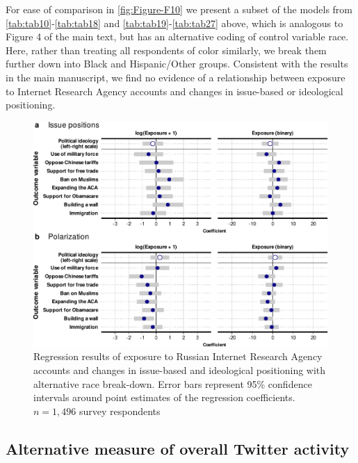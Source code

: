 \documentclass[
  12pt,
]{article}
\begin{document}
For ease of comparison in \autoref{fig:Figure-F10} we present a subset of the models from \ref{tab:tab10}-\ref{tab:tab18} and \ref{tab:tab19}-\ref{tab:tab27} above, which is analogous to Figure 4 of the main text, but has an alternative coding of control variable race. Here, rather than treating all respondents of color similarly, we break them further down into Black and Hispanic/Other groups. Consistent with the results in the main manuscript, we find no evidence of a relationship between exposure to Internet Research Agency accounts and changes in issue-based or ideological positioning.

\begin{figure}
\centering
\includegraphics{Appendix_files/figure-latex/Figure-F10-1.pdf}
\caption{\label{fig:Figure-F10}Regression results of exposure to Russian Internet Research Agency accounts and changes in issue-based and ideological positioning with alternative race break-down. Error bars represent 95\% confidence intervals around point estimates of the regression coefficients. \(n = 1,496\) survey respondents}
\end{figure}

\clearpage

\hypertarget{alternative-measure-of-overall-twitter-activity-1}{%
\subsection{Alternative measure of overall Twitter activity}\label{alternative-measure-of-overall-twitter-activity-1}}
\end{document}
